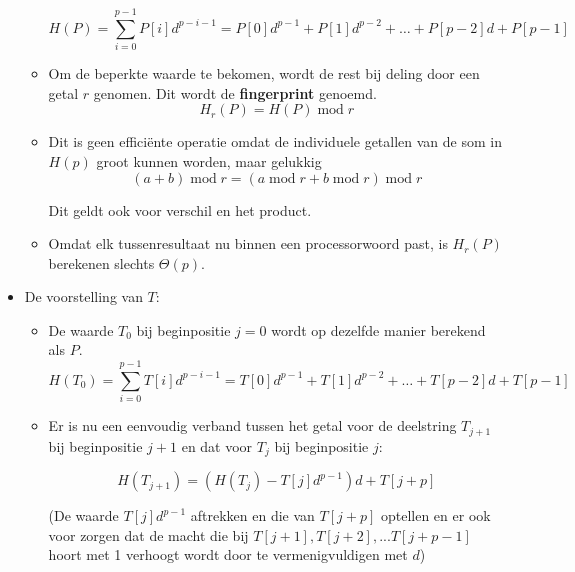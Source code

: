 \begin{itemize}
\begin{itemize}
        $$H(P) = \sum_{i=0}^{p-1} P[i]d^{p-i-1} = P[0]d^{p-1} + P[1]d^{p-2} + \dots + P[p-2]d + P[p-1]$$

        \item Om de beperkte waarde te bekomen, wordt de rest bij deling door een getal $r$ genomen. Dit wordt de \textbf{fingerprint} genoemd.
        $$H_r(P) = H(P)\;\mathrm{mod}\;r$$
    
        \item Dit is geen efficiënte operatie omdat de individuele getallen van de som in $H(p)$ groot kunnen worden, maar gelukkig
        $$(a + b) \;\mathrm{mod}\;r = (a\;\mathrm{mod}\;r + b\;\mathrm{mod}\;r)\;\mathrm{mod}\;r$$
    
        Dit geldt ook voor verschil en het product.
    
        \item Omdat elk tussenresultaat nu binnen een processorwoord past, is $H_r(P)$ berekenen slechts $\Theta(p)$.
    \end{itemize}
    \item De voorstelling van $T$:
    \begin{itemize}
        \item De waarde $T_0$ bij beginpositie $j = 0$ wordt op dezelfde manier berekend als $P$.
        $$H(T_0) = \sum_{i=0}^{p-1} T[i]d^{p-i-1} = T[0]d^{p-1} + T[1]d^{p-2} + \dots + T[p-2]d + T[p-1]$$

        \item Er is nu een eenvoudig verband tussen het getal voor de deelstring $T_{j + 1}$ bij beginpositie $j + 1$ en dat voor $T_{j}$ bij beginpositie $j$:

        $$H(T_{j + 1}) = (H(T_j) - T[j]d^{p-1})d + T[j + p]$$

        (De waarde $T[j]d^{p-1}$ aftrekken en die van $T[j + p]$ optellen en er ook voor zorgen dat de macht die bij $T[j +1], T[j + 2], ... T[j + p -1]$  hoort met 1 verhoogt wordt door te vermenigvuldigen met $d$)


\end{itemize}
\end{itemize}
